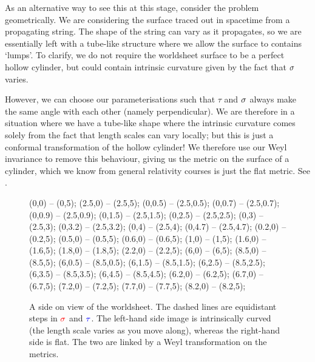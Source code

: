 As an alternative way to see this at this stage, consider the problem geometrically. We are considering the surface traced out in spacetime from a propagating string. The shape of the string can vary as it propagates, so we are essentially left with a tube-like structure where we allow the surface to contains `lumps'. To clarify, we do not require the worldsheet surface to be a perfect hollow cylinder, but could contain intrinsic curvature given by the fact that $\sigma$ varies. 

However, we can choose our parameterisations such that $\tau$ and $\sigma$ always make the same angle with each other (namely perpendicular). We are therefore in a situation where we have a tube-like shape where the intrinsic curvature comes solely from the fact that length scales can vary locally; but this is just a conformal transformation of the hollow cylinder! We therefore use our Weyl invariance to remove this behaviour, giving us the metric on the surface of a cylinder, which we know from general relativity courses is just the flat metric. See .

\begin{figure}
    \begin{center}
        \btik 
             (0,0) -- (0,5);
             (2.5,0) -- (2.5,5);
             (0,0.5) -- (2.5,0.5);
             (0,0.7) -- (2.5,0.7);
              (0,0.9) -- (2.5,0.9);
             (0,1.5) -- (2.5,1.5);
             (0,2.5) -- (2.5,2.5);
             (0,3) -- (2.5,3);
             (0,3.2) -- (2.5,3.2);
             (0,4) -- (2.5,4);
             (0,4.7) -- (2.5,4.7);
             (0.2,0) -- (0.2,5);
             (0.5,0) -- (0.5,5);
             (0.6,0) -- (0.6,5);
             (1,0) -- (1,5);
             (1.6,0) -- (1.6,5);
             (1.8,0) -- (1.8,5);
             (2.2,0) -- (2.2,5);
             (6,0) -- (6,5);
             (8.5,0) -- (8.5,5);
             (6,0.5) -- (8.5,0.5);
             (6,1.5) -- (8.5,1.5);
             (6,2.5) -- (8.5,2.5);
             (6,3.5) -- (8.5,3.5);
             (6,4.5) -- (8.5,4.5);
             (6.2,0) -- (6.2,5);
             (6.7,0) -- (6.7,5);
             (7.2,0) -- (7.2,5);
             (7.7,0) -- (7.7,5);
             (8.2,0) -- (8.2,5);
        \etik 
    \end{center}
    \caption{A side on view of the worldsheet. The dashed lines are equidistant steps in $\textcolor{red}{\sigma}$ and $\textcolor{blue}{\tau}$. The left-hand side image is intrinsically curved (the length scale varies as you move along), whereas the right-hand side is flat. The two are linked by a Weyl transformation on the metrics.}
    \label{fig:WeylMetricPolyakov}
\end{figure}

